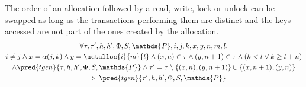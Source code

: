 \lem The order of an allocation followed by a read, write, lock or unlock can be swapped as long as the transactions performing them are distinct and the keys accessed are not part of the ones created by the allocation.
\begin{gather*}
	\forall \tau, \tau', h, h', \Phi, S, \mathds{P}, i, j, k, x, y, n, m, l \ldotp \\
		i \neq j \land x = \alpha(j, k) \land y = \actalloc{i}{m}{l} \land (x, n) \in \tau \land (y, n+1) \in \tau \land (k < l \lor k \geq l + n) \\ \land \pred{tgen}{\tau, h, h', \Phi, S, \mathds{P}} \land \tau' = \tau \setminus \{(x, n), (y, n+1)\} \cup \{ (x, n+1), (y, n) \}
		\\	 
	 \implies \pred{tgen}{\tau', h, h', \Phi, S, \mathds{P}}
\end{gather*}
